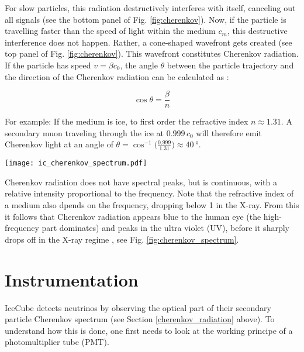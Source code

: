 For slow particles, this radiation destructively interferes with itself, canceling out all signals (see the bottom panel of Fig. \ref{fig:cherenkov}). Now, if the particle is travelling faster than the speed of light within the medium $c_m$, this destructive interference does not happen. Rather, a cone-shaped wavefront gets created (see top panel of Fig. \ref{fig:cherenkov}). This wavefront constitutes Cherenkov radiation. If the particle has speed $v=\beta c_0$, the angle $\theta$ between the particle trajectory and the direction of the Cherenkov radiation can be calculated as :

\begin{equation}
\cos{\theta} = \frac{\beta}{n}
\end{equation}

For example: If the medium is ice, to first order the refractive index $n\approx1.31$. A secondary muon traveling through the ice at $0.999\,c_0$ will therefore emit Cherenkov light at an angle of $\theta = \cos^{-1}{\big(\frac{0.999}{1.31}\big)} \approx \SI{40}{\degree}$. 
\begin{marginfigure}
    \texttt{[image: ic\_cherenkov\_spectrum.pdf]}
    \caption[Cherenkov spectrum]{Cherenkov spectrum for a particle with $v=0.8 \,c_0$ in water. The intensity peaks at $\SI{4e15}{\Hz}$, corresponding to a wavelength of \SI{75}{\nm}, lying at the high-frequency end of the UV spectrum. Adopted from \cite{Fulop1992}.}
\end{marginfigure}
Cherenkov radiation does not have spectral peaks, but is continuous, with a relative intensity proportional to the frequency. Note that the refractive index of a medium also dpends on the frequency, dropping below 1 in the X-ray. From this it follows that Cherenkov radiation appears blue to the human eye (the high-frequency part dominates) and peaks in the ultra violet (UV), before it sharply drops off in the X-ray regime , see Fig. \ref{fig:cherenkov_spectrum}.

\section{Instrumentation}

IceCube detects neutrinos by observing the optical part of their secondary particle Cherenkov spectrum (see Section \ref{cherenkov_radiation} above). To understand how this is done, one first needs to look at the working principe of a photomultiplier tube (PMT).

